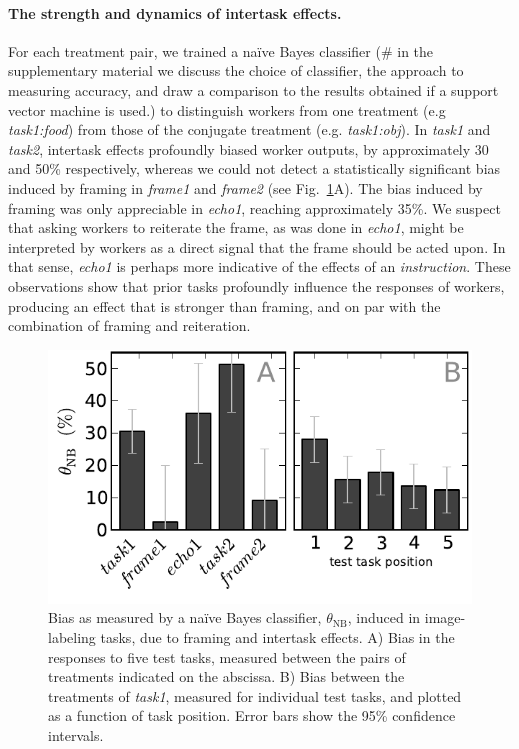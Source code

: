 \documentclass[12pt]{article}
\begin{document}
\paragraph{The strength and dynamics of intertask effects.}
For each treatment pair, we trained a na\"ive Bayes classifier (\# in the 
supplementary material we discuss the choice of classifier, the
approach to measuring accuracy, and draw a comparison to the results obtained 
if a support vector machine is used.) to distinguish workers from one 
treatment (e.g \textit{task1:food}) from those of the conjugate treatment 
(e.g. \textit{task1:obj}).  In \textit{task1} and \textit{task2}, intertask 
effects profoundly biased worker outputs, by approximately 30 and 50\% 
respectively, whereas we could not detect 
a statistically significant bias induced by framing in \textit{frame1} and 
\textit{frame2} (see Fig.~\ref{fig:theta}A).  The bias induced
by framing was only appreciable in \textit{echo1}, reaching approximately 
35\%.  
We suspect that asking workers to reiterate the
frame, as was done in \textit{echo1}, might be interpreted by workers as
a direct signal that the frame should be acted upon.  In that sense, 
\textit{echo1} is perhaps more indicative of the effects of an 
\textit{instruction}.  These observations show that
prior tasks profoundly influence the responses of workers, producing an
effect that is stronger than framing, and on par with the combination of 
framing and reiteration.

\begin{figure}
	\centering
	\includegraphics[scale=1]{figs/theta.pdf}
	\caption{
		Bias as measured by a na\"ive Bayes classifier, $\theta_\mathrm{NB}$,
		induced in image-labeling tasks, due to framing and 
		intertask effects. 
		A) Bias in the responses to five test tasks,
		measured between the pairs of treatments indicated on the abscissa.  
		B) Bias between the treatments of \textit{task1}, 
		measured for individual test tasks, and plotted as a function of 
		task position.  Error bars show the 95\% confidence intervals.
	}
	\label{fig:theta}
\end{figure}
\end{document}
